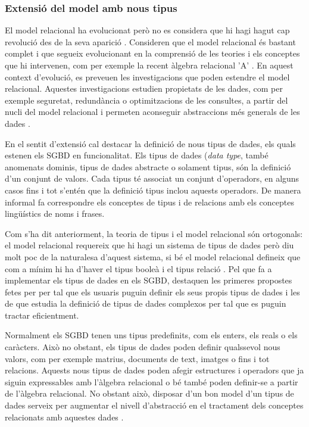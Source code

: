 \subsubsection{Extensió del model amb nous tipus}
\label{sec:art:relacional-tipus}

El model relacional ha evolucionat però no es considera que hi hagi hagut
cap revolució des de la seva aparició
\parencite[cap.~19]{date06}. %
Consideren que el model relacional és bastant complet i que segueix
evolucionant en la comprensió de les teories i els conceptes que hi
intervenen, com per exemple la recent àlgebra relacional
'A' \parencite[ap.~A]{date06:_datab_types_relat_model}.  En aquest
context d'evolució, es preveuen les investigacions que poden estendre
el model relacional. Aquestes investigacions estudien propietats de
les dades, com per exemple seguretat, redundància o optimitzacions de
les consultes, a partir del nucli del model relacional i permeten
aconseguir abstraccions més generals de les
dades \parencite[cap.~25]{date06}. %


En el sentit d'extensió cal destacar la definició de nous tipus de
dades, els quals estenen els SGBD en funcionalitat.  Els tipus de
dades (\emph{data type}, també anomenats dominis, tipus de dades
abstracte o solament tipus, són la definició d'un conjunt de
valors. Cada tipus té associat un conjunt d'operadors, en alguns casos
fins i tot s'entén que la definició tipus inclou aquests operadors.
De manera informal \parencite{date04:introduction8} fa correspondre
els conceptes de tipus i de relacions amb els conceptes lingüístics de
noms i frases.


Com s'ha dit anteriorment, la teoria de tipus i el model relacional
són ortogonals: el model relacional requereix que hi hagi un sistema
de tipus de dades però diu molt poc de la naturalesa d'aquest sistema,
si bé el model relacional defineix que com a mínim hi ha d'haver el
tipus booleà i el tipus
relació \parencite{date:thethirdmanifesto}. 
Pel que fa a implementar
els tipus de dades en els SGBD, destaquen les primeres propostes fetes per
\textcite{stonebraker86} per tal que els usuaris puguin definir els
seus propis tipus de dades i les de \textcite{seshadri98:_enhan} que
estudia la definició de tipus de dades complexos per tal que es puguin
tractar eficientment.


Normalment els SGBD tenen uns tipus predefinits, com els enters, els
reals o els caràcters. Això no obstant, els tipus de dades poden
definir qualssevol nous valors, com per exemple matrius, documents de
text, imatges o fins i tot relacions.  Aquests nous tipus de dades
poden afegir estructures i operadors que ja siguin expressables amb
l'àlgebra relacional o bé també poden definir-se a partir de l'àlgebra
relacional. No obstant això, disposar d'un bon model d'un tipus de
dades serveix per augmentar el nivell d'abstracció en el tractament
dels conceptes relacionats amb aquestes dades
\parencite{date02:_tempor_data_relat_model}. %


